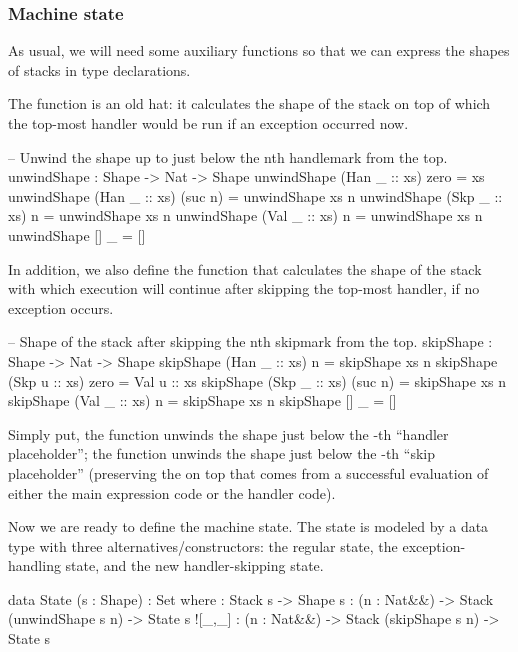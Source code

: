 \subsubsection{Machine state}\label{sec:lin-machine-state}

As usual, we will need some auxiliary functions so that we can express the
shapes of stacks in type declarations.

The function  is an old hat: it calculates the shape of the stack
on top of which the top-most handler would be run if an exception occurred now.
\begin{code}
  -- Unwind the shape up to just below the n\-th handle\-mark from the top.
  unwindShape : Shape -> Nat -> Shape
  unwindShape (Han _ :: xs)  zero   = xs
  unwindShape (Han _ :: xs) (suc n) = unwindShape xs n
  unwindShape (Skp _ :: xs)  n      = unwindShape xs n
  unwindShape (Val _ :: xs)  n      = unwindShape xs n
  unwindShape []            _      = []
\end{code}

\noindent In addition, we also define the function  that calculates
the shape of the stack with which execution will continue after skipping
the top-most handler, if no exception occurs.
\begin{code}
  -- Shape of the stack after skipping the n\-th skip\-mark from the top.
  skipShape : Shape -> Nat -> Shape
  skipShape (Han _ :: xs)  n      = skipShape xs n
  skipShape (Skp u :: xs)  zero   = Val u :: xs
  skipShape (Skp _ :: xs) (suc n) = skipShape xs n
  skipShape (Val _ :: xs)  n      = skipShape xs n
  skipShape []            _      = []
\end{code}

\noindent Simply put, the function  unwinds the shape just
below the -th ``handler placeholder''; the function 
unwinds the shape just below the -th ``skip placeholder'' (preserving
the  on top that comes from a successful evaluation of either the
main expression code or the handler code).

Now we are ready to define the machine state. The state is modeled by a data
type with three alternatives/constructors: the regular state, the
exception-handling state, and the new handler-skipping state.
\begin{code}
  data State (s : Shape) : Set where
    \tick[_] : Stack s -> Shape s
    \x[_,_] : (n : Nat&\!&) -> Stack (unwindShape s n) -> State s
    ![_,_] : (n : Nat&\!&) -> Stack (skipShape s n) -> State s
\end{code}

